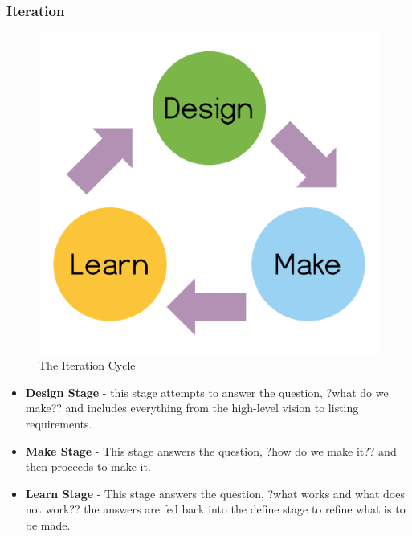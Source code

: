 \begin{frame}
	\frametitle{Iteration}
	\begin{figure}
		\includegraphics[scale=0.4]{assets/iteration.png}
		\caption{The Iteration Cycle}
	\end{figure}
\end{frame}

\begin{frame}
	\begin{itemize}
		\item \textbf{Design Stage} - this stage attempts to answer the question, ?what do we make?? and includes everything from the high-level vision to listing requirements. 
		\item \textbf{Make Stage} - This stage answers the question, ?how do we make it?? and then proceeds to make it. 
		\item \textbf{Learn Stage} - This stage answers the question, ?what works and what does not work?? the answers are fed back into the define stage to refine what is to be made. 
	\end{itemize}
\end{frame}
	


